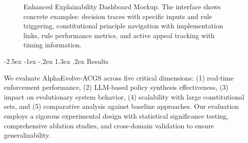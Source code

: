 \documentclass[manuscript,screen,review,anonymous,9pt]{acmart}
\makeatletter
\renewcommand\section{\@startsection{section}{1}{\z@}%
  {-2.5ex \@plus -1ex \@minus -.2ex}%
  {1.3ex \@plus.2ex}%
  {\normalfont\Large\bfseries}}
\makeatother
\begin{document}
\begin{figure}[htbp]
  \centering
  \caption[Enhanced explainability dashboard mockup]{Enhanced Explainability Dashboard Mockup. The interface shows concrete examples: decision traces with specific inputs and rule triggering, constitutional principle navigation with implementation links, rule performance metrics, and active appeal tracking with timing information.}
  \label{fig:explainability_dashboard}
\end{figure}

\section{Results}
\label{sec:results}

We evaluate AlphaEvolve-ACGS across five critical dimensions: (1) real-time enforcement performance, (2) LLM-based policy synthesis effectiveness, (3) impact on evolutionary system behavior, (4) scalability with large constitutional sets, and (5) comparative analysis against baseline approaches. Our evaluation employs a rigorous experimental design with statistical significance testing, comprehensive ablation studies, and cross-domain validation to ensure generalizability.
\end{document}
